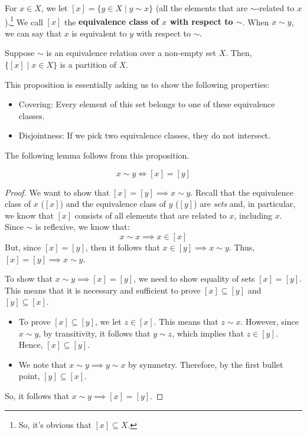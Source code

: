 \documentclass[letterpaper]{article}
\begin{document}
\bigskip 

For $x \in X$, we let $[x] = \{y \in X \mid y \sim x\}$ (all the elements that are $\sim$-related to $x$).\footnote{So, it's obvious that $[x] \subseteq X$.} We call $[x]$ the \textbf{equivalence class of $x$ with respect to $\sim$}. When $x \sim y$, we can say that $x$ is equivalent to $y$ with respect to $\sim$. 

\begin{proposition}
    Suppose $\sim$ is an equivalence relation over a non-empty set $X$. Then, $\{[x] \mid x \in X\}$ is a partition of $X$. 
\end{proposition}
This proposition is essentially asking us to show the following properties: 
\begin{itemize}
    \item Covering: Every element of this set belongs to one of these equivalence classes. 
    \item Disjointness: If we pick two equivalence classes, they do not intersect.
\end{itemize}
The following lemma follows from this proposition.
\begin{lemma}{}{}
    \[x \sim y \iff [x] = [y]\]
\end{lemma}
\begin{proof}
    We want to show that $[x] = [y] \implies x \sim y$. Recall that the equivalence class of $x$ ($[x]$) and the equivalence class of $y$ ($[y]$) are \emph{sets} and, in particular, we know that $[x]$ consists of all elements that are related to $x$, including $x$. Since $\sim$ is reflexive, we know that:
    \[x \sim x \implies x \in [x]\]
    But, since $[x] = [y]$, then it follows that $x \in [y] \implies x \sim y$. Thus, $[x] = [y] \implies x \sim y$. 
    
    \bigskip 

    To show that $x \sim y \implies [x] = [y]$, we need to show equality of sets $[x] = [y]$. This means that it is necessary and sufficient to prove $[x] \subseteq [y]$ and $[y] \subseteq [x]$.
    \begin{itemize}
        \item To prove $[x] \subseteq [y]$, we let $z \in [x]$. This means that $z \sim x$. However, since $x \sim y$, by transitivity, it follows that $y \sim z$, which implies that $z \in [y]$. Hence, $[x] \subseteq [y]$. 
        \item We note that $x \sim y \implies y \sim x$ by symmetry. Therefore, by the first bullet point, $[y] \subseteq [x]$.
    \end{itemize} 
    So, it follows that $x \sim y \implies [x] = [y]$. 
\end{proof}
\end{document}
